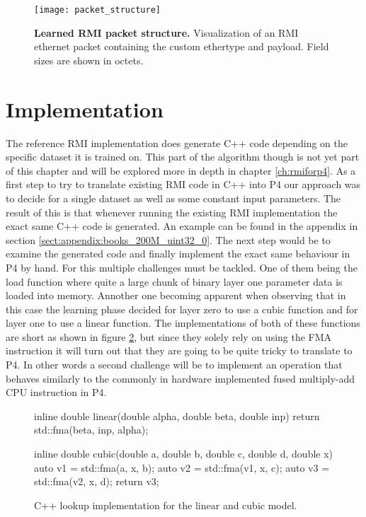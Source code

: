 \begin{figure}[ht]
  \centering
  \texttt{[image: packet\_structure]}
  \caption[RMI packet structure]{
    \textbf{Learned RMI packet structure.} Visualization of an RMI ethernet packet containing the custom ethertype and payload. Field sizes are shown in octets.
  }
  \label{fig:packet_structure}
\end{figure}

\section{Implementation}
The reference RMI implementation does generate C++ code depending on the specific dataset it is trained on. This part of the algorithm though is not yet part of this chapter and will be explored more in depth in chapter \ref{ch:rmiforp4}. As a first step to try to translate existing RMI code in C++ into P4 our approach was to decide for a single dataset as well as some constant input parameters. The result of this is that whenever running the existing RMI implementation the exact same C++ code is generated. An example can be found in the appendix in section \ref{sect:appendix:books_200M_uint32_0}. The next step would be to examine the generated code and finally implement the exact same behaviour in P4 by hand. For this multiple challenges must be tackled. One of them being the load function where quite a large chunk of binary layer one parameter data is loaded into memory. Annother one becoming apparent when observing that in this case the learning phase decided for layer zero to use a cubic function and for layer one to use a linear function. The implementations of both of these functions are short as shown in figure \ref{fig:linear_cubic}, but since they solely rely on using the FMA instruction it will turn out that they are going to be quite tricky to translate to P4. In other words a second challenge will be to implement an operation that behaves similarly to the commonly in hardware implemented fused multiply-add CPU instruction in P4.

\captionsetup[figure]{position=bottom,skip=-10pt,width=.9\linewidth} %
\begin{figure}[ht]
  \begin{C++}
inline double linear(double alpha, double beta, double inp) {
  return std::fma(beta, inp, alpha);
}

inline double cubic(double a, double b, double c, double d, double x) {
  auto v1 = std::fma(a, x, b);
  auto v2 = std::fma(v1, x, c);
  auto v3 = std::fma(v2, x, d);
  return v3;
}\end{C++}
  \caption[Linear and cubic lookup implementation in C++]{ C++ lookup implementation for the linear and cubic model. }
  \label{fig:linear_cubic}
\end{figure}

